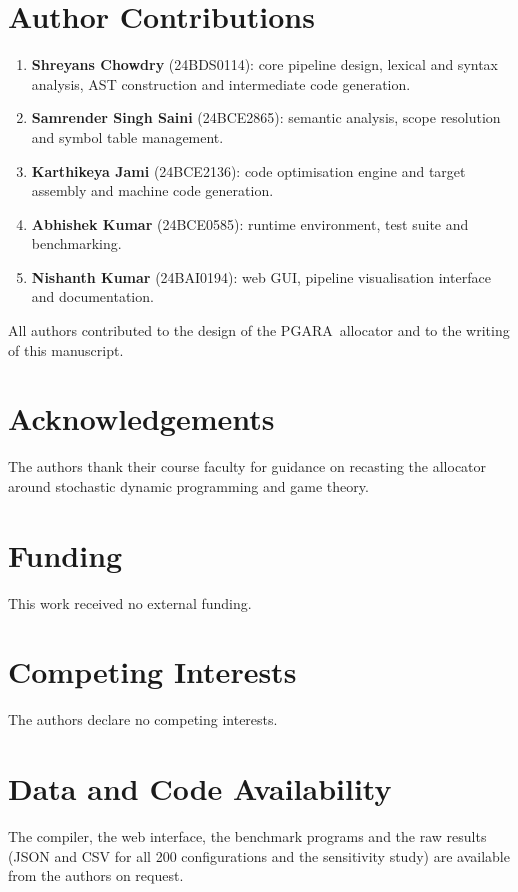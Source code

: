 \documentclass[conference]{IEEEtran}
\newcommand{\MG}{PGARA}
\begin{document}
\section*{Author Contributions}

\begin{enumerate}
\item \textbf{Shreyans Chowdry} (24BDS0114): core pipeline design,
lexical and syntax analysis, AST construction and intermediate code
generation.
\item \textbf{Samrender Singh Saini} (24BCE2865): semantic analysis,
scope resolution and symbol table management.
\item \textbf{Karthikeya Jami} (24BCE2136): code optimisation engine
and target assembly and machine code generation.
\item \textbf{Abhishek Kumar} (24BCE0585): runtime environment, test
suite and benchmarking.
\item \textbf{Nishanth Kumar} (24BAI0194): web GUI, pipeline
visualisation interface and documentation.
\end{enumerate}
All authors contributed to the design of the \MG\ allocator and to
the writing of this manuscript.

\section*{Acknowledgements}
The authors thank their course faculty for guidance on recasting the
allocator around stochastic dynamic programming and game theory.

\section*{Funding}
This work received no external funding.

\section*{Competing Interests}
The authors declare no competing interests.

\section*{Data and Code Availability}
The compiler, the web interface, the benchmark programs and the raw
results (JSON and CSV for all 200 configurations and the sensitivity
study) are available from the authors on request.
\end{document}
